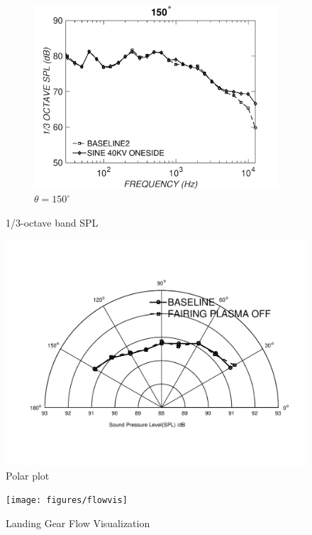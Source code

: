 \begin{figure}
\begin{subfigure}{0.32\textwidth}
\includegraphics[width=\linewidth]{figures/octave1502}
\caption{$\theta=150^\circ$}
\label{fig:octave1502}
\end{subfigure}

\caption{1/3-octave band SPL}
\label{fig:octave2}
\end{figure}

\begin{figure}
	\begin{center}
		\centerline{\includegraphics[scale=0.7]{figures/polar_plot2}}
		\caption{Polar plot}
		\label{fig:polar}
	\end{center}
\end{figure}

\begin{figure}
	\begin{center}
		\centerline{\texttt{[image: figures/flowvis]}}
		\caption{Landing Gear Flow Visualization}
		\label{fig:flowvis}
	\end{center}
\end{figure}




